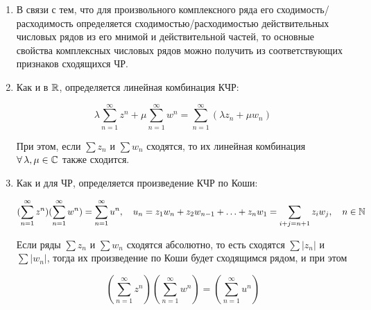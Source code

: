 \documentclass[../../main.tex]{subfiles}
\begin{document}
\begin{rems}
	\begin{enumerate}
		\;
		
		\item В связи с тем, что для произвольного комплексного ряда его 
		сходимость/расходимость определяется сходимостью/расходимостью 
		действительных 
		числовых рядов из его мнимой и действительной частей, то основные свойства 
		комплексных числовых рядов можно получить из соответствующих признаков 
		сходящихся ЧР.
		
		\item Как и в $ \mathbb{R} $, определяется линейная комбинация КЧР:
		
		\[\lambda \sum_{n=1}^{\infty}z^n + \mu \sum_{n=1}^{\infty}w^n = 
		\sum_{n=1}^{\infty}(\lambda z_n + \mu w_n)\]
		
		При этом, если $ \sum z_n $ и $ \sum w_n $ сходятся, то их линейная 
		комбинация $ \forall\, \lambda, \mu \in \mathbb{C} $ также сходится.
		
		\item Как и для ЧР, определяется произведение КЧР по Коши:
		
		\[(\sum_{n=1}^{\infty}z^n)(\sum_{n=1}^{\infty}w^n) = \sum_{n=1}^{\infty} 
		u^n, \quad u_n = z_1w_{n} + z_2w_{n - 1} + \ldots + z_nw_1 = \sum_{i + j = n 
		+ 1} z_iw_j, \quad n \in \mathbb{N}\]
		
		Если ряды $ \sum z_n $ и $ \sum w_n $ сходятся абсолютно, то есть сходятся $ 
		\sum |z_n| $ и $ \sum |w_n| $, тогда их произведение по Коши будет 
		сходящимся рядом, и при этом
		
		\[(\sum_{n=1}^{\infty}z^n)(\sum_{n=1}^{\infty}w^n) = 
		(\sum_{n=1}^{\infty}u^n)\]
	\end{enumerate}
\end{rems}
\end{document}
